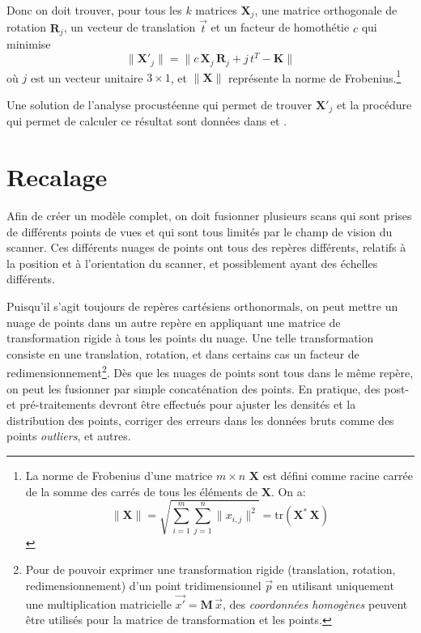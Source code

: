 \documentclass[a4paper,10pt]{scrreprt}
\begin{document}
Donc on doit trouver, pour tous les $k$ matrices $\mathbf{X}_j$, une matrice orthogonale de rotation $\mathbf{R}_j$, un vecteur de translation $\vec{t}$ et un facteur de homothétie $c$ qui minimise
\begin{equation}
	\| \mathbf{X'}_j \| = \| c \, \mathbf{X}_j \, \mathbf{R}_j + j \, t^T - \mathbf{K} \|
\end{equation}
où $j$ est un vecteur unitaire $3 \times 1$, et $\|\mathbf{X}\|$ représente la norme de Frobenius.\footnote{La norme de Frobenius d'une matrice $m \times n$ $\mathbf{X}$ est défini comme racine carrée de la somme des carrés de tous les éléments de $\mathbf{X}$. On a:\begin{equation}
	\| \mathbf{X} \|
	= \sqrt{ \sum_{i=1}^{m} \sum_{j=1}^{n} \| x_{i,j} \|^2 }
	= \text{tr}(\mathbf{X}^* \, \mathbf{X})
\end{equation}}

Une solution de l'analyse procustéenne qui permet de trouver $\mathbf{X'}_j$ et la procédure qui permet de calculer ce résultat sont données dans \cite{Scho1970} et \cite{Scho1966}. 


\section{Recalage}
Afin de créer un modèle complet, on doit fusionner plusieurs scans qui sont prises de différents points de vues et qui sont tous limités par le champ de vision du scanner. Ces différents nuages de points ont tous des repères différents, relatifs à la position et à l'orientation du scanner, et possiblement ayant des échelles différents.

Puisqu'il s'agit toujours de repères cartésiens orthonormals, on peut mettre un nuage de points dans un autre repère en appliquant une matrice de transformation rigide à tous les points du nuage. Une telle transformation consiste en une translation, rotation, et dans certains cas un facteur de redimensionnement\footnote{Pour de pouvoir exprimer une transformation rigide (translation, rotation, redimensionnement) d'un point tridimensionnel $\vec{p}$ en utilisant uniquement une multiplication matricielle $\vec{x'} = \mathbf{M} \, \vec{x}$, des \emph{coordonnées homogènes} peuvent être utilisés pour la matrice de transformation et les points.}. Dès que les nuages de points sont tous dans le même repère, on peut les fusionner par simple concaténation des points. En pratique, des post- et pré-traitements devront être effectués pour ajuster les densités et la distribution des points, corriger des erreurs dans les données bruts comme des points \emph{outliers}, et autres.
\end{document}
